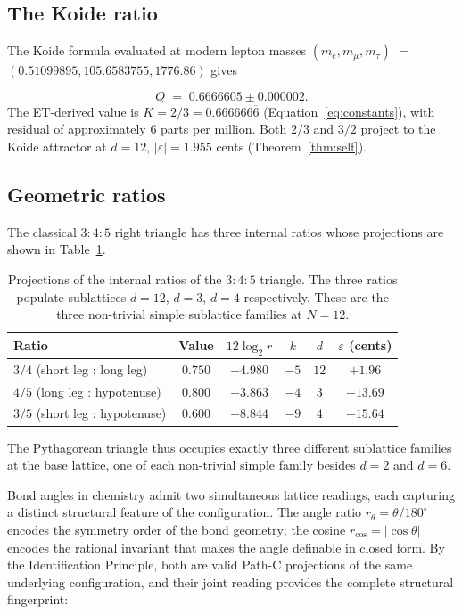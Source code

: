\documentclass[11pt,a4paper]{article}
\theoremstyle{definition}
\theoremstyle{remark}
\newcommand{\eps}{\varepsilon}
\begin{document}
\subsection{The Koide ratio}\label{subsec:koide}

\begin{sloppypar}
The Koide formula evaluated at modern lepton masses $(m_{e},m_{\mu},m_{\tau})$\allowbreak{} $=$\allowbreak{} $(0.51099895, 105.6583755, 1776.86)$\allowbreak{} \cite{CODATA2022} gives
\end{sloppypar}
\[
Q \;=\; 0.6666605\pm 0.000002.
\]
The ET-derived value is $K = 2/3 = 0.666666\overline{6}$ (Equation~\ref{eq:constants}), with residual of approximately $6$ parts per million. Both $2/3$ and $3/2$ project to the Koide attractor at $d=12$, $|\eps|=1.955$ cents (Theorem~\ref{thm:self}).

\subsection{Geometric ratios}\label{subsec:geometry}

The classical $3{:}4{:}5$ right triangle has three internal ratios whose projections are shown in Table~\ref{tab:pyth}.

\begin{table}[h]
\centering
\begin{tabular}{@{}l c c c c c@{}}
\toprule
Ratio & Value & $12\log_{2}r$ & $k$ & $d$ & $\eps$ (cents)\\
\midrule
$3/4$ (short leg : long leg) & $0.750$ & $-4.980$ & $-5$ & $12$ & $+1.96$\\
$4/5$ (long leg : hypotenuse) & $0.800$ & $-3.863$ & $-4$ & $3$ & $+13.69$\\
$3/5$ (short leg : hypotenuse) & $0.600$ & $-8.844$ & $-9$ & $4$ & $+15.64$\\
\bottomrule
\end{tabular}
\caption{Projections of the internal ratios of the $3{:}4{:}5$ triangle. The three ratios populate sublattices $d=12$, $d=3$, $d=4$ respectively. These are the three non-trivial simple sublattice families at $N=12$.}
\label{tab:pyth}
\end{table}

The Pythagorean triangle thus occupies exactly three different sublattice families at the base lattice, one of each non-trivial simple family besides $d=2$ and $d=6$.

Bond angles in chemistry admit two simultaneous lattice readings, each capturing a distinct structural feature of the configuration. The angle ratio $r_{\theta} = \theta/180^{\circ}$ encodes the symmetry order of the bond geometry; the cosine $r_{\cos} = |\cos\theta|$ encodes the rational invariant that makes the angle definable in closed form. By the Identification Principle, both are valid Path-C projections of the same underlying configuration, and their joint reading provides the complete structural fingerprint:
\end{document}
